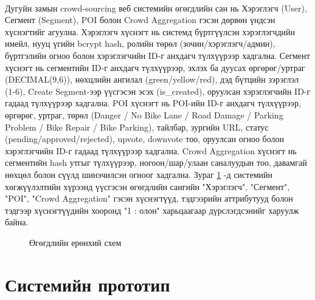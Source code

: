 \paragraph{} Дугуйн замын crowd-sourcing веб системийн өгөгдлийн сан нь Хэрэглэгч (User), Сегмент (Segment), POI болон Crowd Aggregation гэсэн дөрвөн үндсэн хүснэгтийг агуулна. Хэрэглэгч хүснэгт нь системд бүртгүүлсэн хэрэглэгчдийн имейл, нууц үгийн bcrypt hash, ролийн төрөл (зочин/хэрэглэгч/админ), бүртгэлийн огноо болон хэрэглэгчийн ID-г анхдагч түлхүүрээр хадгална. Сегмент хүснэгт нь сегментийн ID-г анхдагч түлхүүрээр, эхлэх ба дуусах өргөрөг/уртраг (DECIMAL(9,6)), нөхцлийн ангилал (green/yellow/red), дэд бүтцийн зэрэглэл (1-6), Create Segment-ээр үүсгэсэн эсэх (is\_created), оруулсан хэрэглэгчийн ID-г гадаад түлхүүрээр хадгална. POI хүснэгт нь POI-ийн ID-г анхдагч түлхүүрээр, өргөрөг, уртраг, төрөл (Danger / No Bike Lane / Road Damage / Parking Problem / Bike Repair / Bike Parking), тайлбар, зургийн URL, статус (pending/approved/rejected), upvote, downvote тоо, оруулсан огноо болон хэрэглэгчийн ID-г гадаад түлхүүрээр хадгална. Crowd Aggregation хүснэгт нь сегментийн hash утгыг түлхүүрээр, ногоон/шар/улаан саналуудын тоо, давамгай нөхцөл болон сүүлд шинэчилсэн огноог хадгална. Зураг \ref{fig:erd} -д системийн хөгжүүлэлтийн хүрээнд үүсгэсэн өгөгдлийн сангийн "Хэрэглэгч", "Сегмент", "POI", "Crowd Aggregation" гэсэн хүснэгтүүд, тэдгээрийн аттрибутууд болон тэдгээр хүснэгтүүдийн хооронд "1 : олон" харьцаагаар дүрслэгдсэнийг харуулж байна.
\begin{figure}[H]
    \centering
    \caption{Өгөгдлийн ерөнхий схем}
    \label{fig:erd}
\end{figure}

\section{Системийн прототип}
